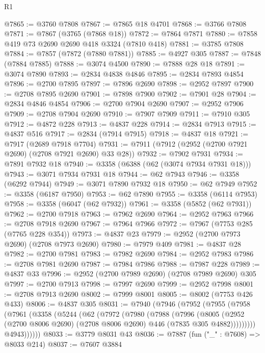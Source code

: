 \begin{lexlean}{R1}
\begin{coremodule}
@7865 := @3760 @7808
@7867 := @7865 @18 @4701
@7868 := @3766 @7808
@7871 := @7867 (@3765 (@7868 @18))
@7872 := @7864 @7871
@7880 := @7858 @419 @73 @2690 @2690 @418 @3324 (@7810 @418)
@7881 := @3785 @7808
@7884 := @7857 (@7872 (@7880 @7881))
@7885 := @4927 @305
@7887 := @7848 (@7884 @7885)
@7888 := @3074 @4500
@7890 := @7888 @28 @18
@7891 := @3074 @7890
@7893 := @2834 @4838 @4846
@7895 := @2834 @7893 @4854
@7896 := @2700 @7895
@7897 := @7896 @2690
@7898 := @2952 @7897
@7900 := @2708 @7895 @2690
@7901 := @7898 @7900
@7902 := @7901 @28
@7904 := @2834 @4846 @4854
@7906 := @2700 @7904 @2690
@7907 := @2952 @7906
@7909 := @2708 @7904 @2690
@7910 := @7907 @7909
@7911 := @7910 @305
@7912 := @4872 @228
@7913 := @4837 @228
@7914 := @2834 @7913
@7915 := @4837 @516
@7917 := @2834 (@7914 @7915)
@7918 := @4837 @18
@7921 := @7917 (@2689 @7918 @7704)
@7931 := @7911 (@7912 (@2952 (@2700 @7921 @2690) (@2708 @7921 @2690) @33 @28))
@7932 := @7902 @7931
@7934 := @7891 @7932 @18
@7940 := @3358 (@6388 (@62 (@3074 @7934 @7931 @18)))
@7943 := @3071 @7934 @7931 @18
@7944 := @62 @7943
@7946 := @3358 (@6292 @7944)
@7949 := @3071 @7890 @7932 @18
@7950 := @62 @7949
@7952 := @3358 (@6187 @7950)
@7953 := @62 @7890
@7955 := @3358 (@6114 @7953)
@7958 := @3358 (@6047 (@62 @7932))
@7961 := @3358 (@5852 (@62 @7931))
@7962 := @2700 @7918
@7963 := @7962 @2690
@7964 := @2952 @7963
@7966 := @2708 @7918 @2690
@7967 := @7964 @7966
@7972 := @7967 (@7753 @285 (@7765 @228 @354))
@7973 := @4837 @23
@7979 := @2952 (@2700 @7973 @2690) (@2708 @7973 @2690)
@7980 := @7979 @409
@7981 := @4837 @28
@7982 := @2700 @7981
@7983 := @7982 @2690
@7984 := @2952 @7983
@7986 := @2708 @7981 @2690
@7987 := @7984 @7986
@7988 := @7987 @228
@7989 := @4837 @33
@7996 := @2952 (@2700 @7989 @2690) (@2708 @7989 @2690) @305
@7997 := @2700 @7913
@7998 := @7997 @2690
@7999 := @2952 @7998
@8001 := @2708 @7913 @2690
@8002 := @7999 @8001
@8005 := @8002 (@7753 @426 @433)
@8006 := @4837 @305
@8031 := @7940
    (@7946
      (@7952
        (@7955
          (@7958
            (@7961
              (@3358
                (@5244
                  (@62
                    (@7972
                      (@7980
                        (@7988
                          (@7996
                            (@8005
                              (@2952
                                (@2700 @8006 @2690)
                                (@2708 @8006 @2690)
                                @446
                                (@7835 @305 @4882)))))))))
                @4943))))))
@8033 := @3779 @8031 @43
@8036 := @7887 (fun ("_" : @7608) => @8033 @214)
@8037 := @7607 @3884

\end{coremodule}
\end{lexlean}
